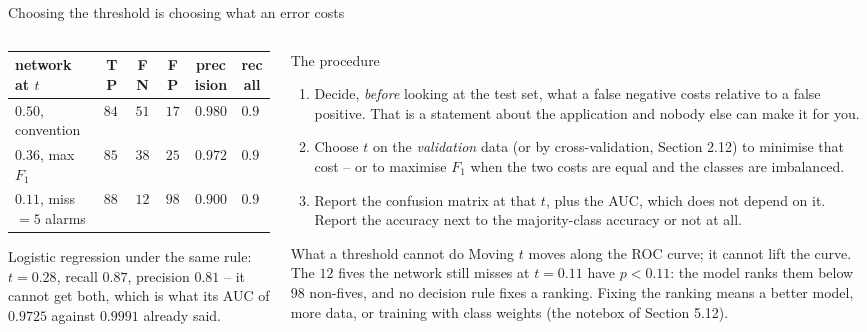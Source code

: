 \documentclass[10pt,aspectratio=169]{beamer}
\begin{document}
\begin{frame}{Choosing the threshold is choosing what an error costs}
\small
\begin{columns}[T]
\begin{column}{0.5\textwidth}
\begin{center}
\scriptsize
\begin{tabular}{@{}lccccc@{}}
\toprule
network at $t$ & TP & FN & FP & precision & recall\\
\midrule
$0.50$, convention & $841$ & $51$ & $17$ & $0.980$ & $0.943$\\
$0.36$, max $F_1$ & $854$ & $38$ & $25$ & $0.972$ & $0.957$\\
$0.11$, miss $=5$ alarms & $880$ & $12$ & $98$ & $0.900$ & $0.986$\\
\bottomrule
\end{tabular}
\end{center}
\scriptsize
Logistic regression under the same rule: $t=0.28$, recall $0.87$,
precision $0.81$ -- it cannot get both, which is what its AUC of $0.9725$
against $0.9991$ already said.
\end{column}
\begin{column}{0.48\textwidth}
\begin{block}{The procedure}
\scriptsize
\begin{enumerate}
  \item Decide, \emph{before} looking at the test set, what a false negative
        costs relative to a false positive.  That is a statement about the
        application and nobody else can make it for you.
  \item Choose $t$ on the \emph{validation} data (or by cross-validation,
        Section 2.12) to minimise that cost -- or to maximise $F_1$ when
        the two costs are equal and the classes are imbalanced.
  \item Report the confusion matrix at that $t$, plus the AUC, which does
        not depend on it.  Report the accuracy next to the majority-class
        accuracy or not at all.
\end{enumerate}
\end{block}
\begin{block}{What a threshold cannot do}
\scriptsize
Moving $t$ moves along the ROC curve; it cannot lift the curve.  The
$12$ fives the network still misses at $t=0.11$ have $p<0.11$: the model
ranks them below $98$ non-fives, and no decision rule fixes a ranking.
Fixing the ranking means a better model, more data, or training with class
weights (the notebox of Section 5.12).
\end{block}
\end{column}
\end{columns}
\end{frame}
\end{document}
